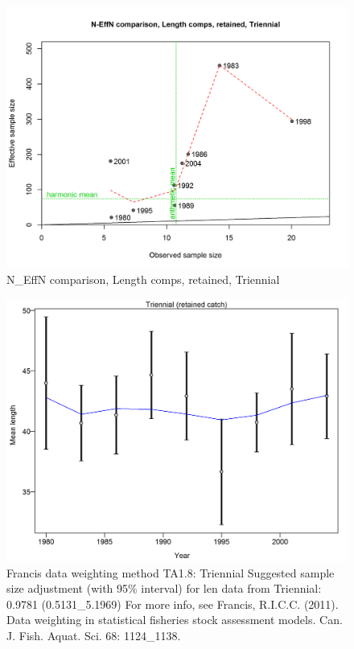 \documentclass[12pt,]{article}
\begin{document}
\begin{figure}[htbp]
\centering
\includegraphics{./r4ss/plots_mod1/comp_lenfit_sampsize_flt5mkt2.png}
\caption{N\_EffN comparison, Length comps, retained, Triennial
\label{fig:mod1_24_comp_lenfit_sampsize_flt5mkt2}}
\end{figure}

\begin{figure}[htbp]
\centering
\includegraphics{./r4ss/plots_mod1/comp_lenfit_data_weighting_TA1.8_Triennial.png}
\caption{Francis data weighting method TA1.8: Triennial Suggested sample
size adjustment (with 95\% interval) for len data from Triennial: 0.9781
(0.5131\_5.1969) For more info, see Francis, R.I.C.C. (2011). Data
weighting in statistical fisheries stock assessment models. Can. J.
Fish. Aquat. Sci. 68: 1124\_1138.
\label{fig:mod1_25_comp_lenfit_data_weighting_TA1.8_Triennial}}
\end{figure}
\end{document}
